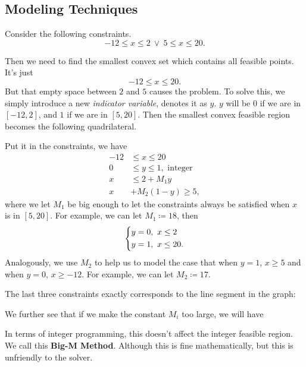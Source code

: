 \subsection{Modeling Techniques}
\begin{eg}
	Consider the following constraints.
	\[
		-12\leq x\leq 2\ \lor\ 5\leq x\leq 20.
	\]
	\begin{figure}[H]
		\centering
		\label{fig:integer-programming-eg1}
	\end{figure}
	Then we need to find the smallest convex set which contains all feasible points. It's just
	\[
		-12\leq x\leq 20.
	\]
	But that empty space between \(2\) and \(5\) causes the problem. To solve this, we simply introduce a new \emph{indicator variable}, denotes
	it as \(y\). \(y\) will be \(0\) if we are in \([-12, 2]\), and \(1\) if we are in \([5, 20]\). Then the smallest convex feasible region becomes
	the following quadrilateral.
	\begin{figure}[H]
		\centering
		\label{fig:integer-programming-eg1.2}
	\end{figure}
	Put it in the constraints, we have
	\[
		\begin{split}
			-12&\leq x\leq 20\\
			0&\leq y\leq 1, \text{ integer}\\
			x&\leq 2+M_1 y\\
			x&+M_2(1 - y)\geq 5,
		\end{split}
	\]
	where we let \(M_1\) be big enough to let the constraints always be satisfied when \(x\) is in \([5, 20]\). For example, we can let \(M_1\coloneqq 18\),
	then
	\[
		\begin{dcases}
			y = 0,\ x\leq 2 \\
			y = 1,\ x\leq 20.
		\end{dcases}
	\]
	Analogously, we use \(M_2\) to help us to model the case that when \(y = 1\), \(x\geq 5\) and when \(y = 0\), \(x\geq -12\). For example, we can let
	\(M_2 \coloneqq 17\).

	The last three constraints exactly corresponds to the line segment in the graph:
	\begin{figure}[H]
		\centering
		\label{fig:integer-programming-eg1.3}
	\end{figure}

	We further see that if we make the constant \(M_{i}\) too large, we will have
	\begin{figure}[H]
		\centering
		\label{fig:integer-programming-eg1.4}
	\end{figure}
	In terms of integer programming, this doesn't affect the integer feasible region. We call this \textbf{Big-M Method}. Although
	this is fine mathematically, but this is unfriendly to the solver.
\end{eg}

